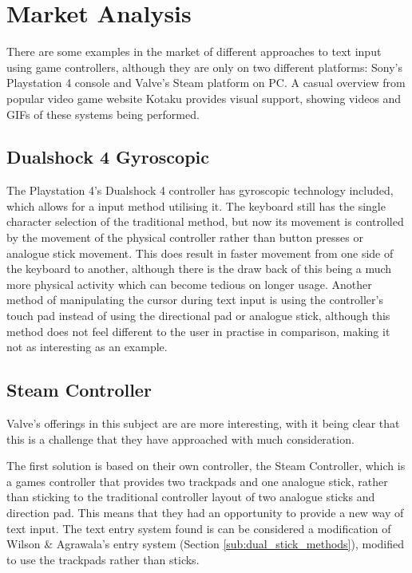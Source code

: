 \documentclass[requirements.tex]{subfiles}
\begin{document}
\section{Market Analysis} %
\label{sec:market_analysis}

There are some examples in the market of different approaches to text input
using game controllers, although they are only on two different platforms:
Sony's Playstation 4 console and Valve's Steam platform on PC. A casual overview
from popular video game website Kotaku \cite{Kotaku} provides visual support,
showing videos and GIFs of these systems being performed.

\subsection{Dualshock 4 Gyroscopic} %
\label{sub:dualshock_4_gyroscopic}
The Playstation 4's Dualshock 4 controller has gyroscopic technology included,
which allows for a input method utilising it. The keyboard still has the single
character selection of the traditional method, but now its movement is
controlled by the movement of the physical controller rather than button presses
or analogue stick movement. This does result in faster movement from one side of
the keyboard to another, although there is the draw back of this being a much
more physical activity which can become tedious on longer usage. Another method
of manipulating the cursor during text input is using the controller's touch pad
instead of using the directional pad or analogue stick, although this method
does not feel different to the user in practise in comparison, making it not as
interesting as an example.

\subsection{Steam Controller} %
\label{sub:steam_controller}
Valve's offerings in this subject are are more interesting, with it being clear
that this is a challenge that they have approached with much consideration.

The first solution is based on their own controller, the Steam Controller, which
is a games controller that provides two trackpads and one analogue stick, rather
than sticking to the traditional controller layout of two analogue sticks and
direction pad. This means that they had an opportunity to provide a new way of
text input. The text entry system found is can be considered a modification of
Wilson \& Agrawala's entry system (Section \ref{sub:dual_stick_methods}),
modified to use the trackpads rather than sticks.
\end{document}
